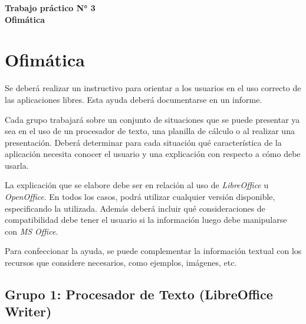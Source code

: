 \documentclass[12pt]{article}
\def\maketitle{

\makeatletter
{\color{bl} \centering \huge \sc \textbf{
Trabajo práctico N° 3\\
\large \vspace*{-8pt} \color{black} Ofimática
\vspace*{8pt} }\par}
\makeatother

\makeatletter


}
\begin{document}
\thispagestyle{empty}
\maketitle
\setlength{\parindent}{0pt}

\section*{Ofimática}

Se deberá realizar un instructivo para orientar a los usuarios en el uso
correcto de las aplicaciones libres. Esta ayuda deberá documentarse en un
informe.

Cada grupo trabajará sobre un conjunto de situaciones que se puede presentar
ya sea en el uso de un procesador de texto, una planilla de cálculo o al
realizar una presentación. Deberá determinar para cada situación qué
característica de la aplicación necesita conocer el usuario y una explicación
con respecto a cómo debe usarla.

La explicación que se elabore debe ser en relación al uso de
\emph{LibreOffice} u \emph{OpenOffice}. En todos los casos, podrá utilizar
cualquier versión disponible, especificando la utilizada. Además deberá
incluir qué consideraciones de compatibilidad debe tener el usuario si la
información luego debe manipularse con \emph{MS Office}.

Para confeccionar la ayuda, se puede complementar la información textual con
los recursos que considere necesarios, como ejemplos, imágenes, etc.

\subsection*{Grupo 1: Procesador de Texto (LibreOffice Writer)}
\end{document}
